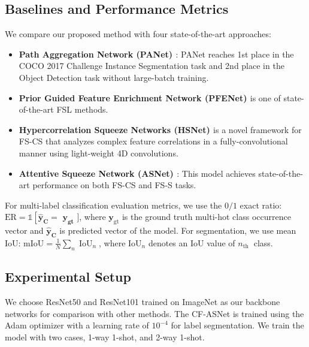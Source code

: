 \documentclass{ieeeaccess}
\begin{document}
\subsection{Baselines and Performance Metrics}

We compare our proposed method with four state-of-the-art approaches:
\begin{itemize}
    
    \item \textbf{Path Aggregation Network (PANet) \cite{Kaixin2019}}: PANet reaches 1st place in the COCO 2017 Challenge Instance Segmentation task and 2nd place in the Object Detection task without large-batch training.
    
    \item \textbf{Prior Guided Feature Enrichment Network (PFENet) \cite{PFENet}} is one of state-of-the-art FSL methods.
    
    \item \textbf{Hypercorrelation Squeeze Networks (HSNet) \cite{HSNet}} is a novel framework for FS-CS that analyzes complex feature correlations in a fully-convolutional manner using light-weight 4D convolutions.
	
	\item \textbf{Attentive Squeeze Network (ASNet) \cite{Kang2022}}: This model achieves state-of-the-art performance on both FS-CS and FS-S tasks.
	
\end{itemize}

For multi-label classification evaluation metrics, we use the $0 / 1$ exact ratio: $\mathrm{ER}=\mathds{1}\left[\hat{\mathbf{y}}_{\mathbf{C}}=\right.$ $\mathbf{y}_\mathbf{gt}$ ], where $\mathbf{y}_{\mathrm{gt}}$ is the ground truth multi-hot class occurrence vector and $\hat{\mathbf{y}}_\mathbf{C}$ is predicted vector of the model.   For segmentation, we use mean IoU: $\mathrm{mIoU}=\frac{1}{N} \sum_{n} \operatorname{IoU}_{n}$, where $\mathrm{IoU}_{n}$ denotes an IoU \cite{iou} value of $n_{\text {th }}$ class.

\subsection{Experimental Setup}
We choose ResNet50 and ResNet101 trained on ImageNet as our backbone networks for comparison with other methods. The CF-ASNet is trained using the Adam optimizer\cite{kingma2014adam} with a learning rate of $10^{-4}$ for label segmentation. We train the model with two cases, 1-way 1-shot, and 2-way 1-shot. 
\end{document}
